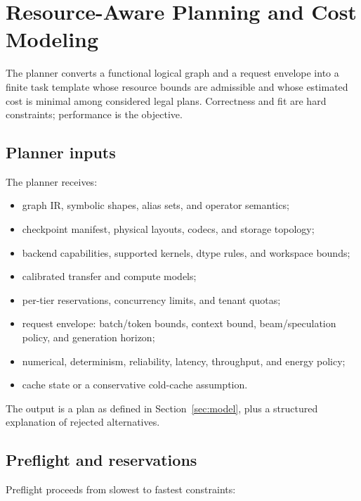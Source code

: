 \section{Resource-Aware Planning and Cost Modeling}
\label{sec:planning}

The planner converts a functional logical graph and a request envelope into a finite task template whose resource bounds are admissible and whose estimated cost is minimal among considered legal plans. Correctness and fit are hard constraints; performance is the objective.

\subsection{Planner inputs}

The planner receives:

\begin{itemize}
  \item graph IR, symbolic shapes, alias sets, and operator semantics;
  \item checkpoint manifest, physical layouts, codecs, and storage topology;
  \item backend capabilities, supported kernels, dtype rules, and workspace bounds;
  \item calibrated transfer and compute models;
  \item per-tier reservations, concurrency limits, and tenant quotas;
  \item request envelope: batch/token bounds, context bound, beam/speculation policy, and generation horizon;
  \item numerical, determinism, reliability, latency, throughput, and energy policy;
  \item cache state or a conservative cold-cache assumption.
\end{itemize}

The output is a plan as defined in Section~\ref{sec:model}, plus a structured explanation of rejected alternatives.

\subsection{Preflight and reservations}

Preflight proceeds from slowest to fastest constraints:

